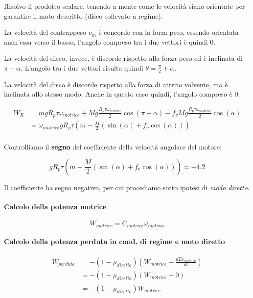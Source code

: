 \documentclass[main.tex]{subfiles}
\begin{document}
Risolvo il prodotto scalare, tenendo a mente come le velocità siano orientate per garantire il moto descritto (disco sollevato a regime).

La velocità del contrappeso $v_m$ è concorde con la forza peso, essendo orientata anch'essa verso il basso, l'angolo compreso tra i due vettori è quindi 0.

La velocità del disco, invece, è discorde rispetto alla forza peso ed è inclinata di $\pi - \alpha$. L'angolo tra i due vettori risulta quindi $\theta = \frac{\pi}{2}+\alpha$.

La velocità del disco è discorde rispetto alla forza di attrito volvente, ma è inclinata allo stesso modo. Anche in questo caso quindi, l'angolo compreso è 0.

\begin{align*}
  W_R &= mgR_p\tau\omega_{motrice} + Mg\frac{R_p\tau\omega_{motrice}}{2}\cos(\pi + \alpha) - f_vMg\frac{R_p\tau\omega_{motrice}}{2}\cos(\alpha)\\
  &= \omega_{motrice}gR_p\tau(m -\frac{M}{2}(\sin(\alpha) + f_v\cos(\alpha)))\\
\end{align*}

Controlliamo il \textbf{segno} del coefficiente della velocità angolare del motore:

\[
  gR_p\tau(m -\frac{M}{2}(\sin(\alpha) + f_v\cos(\alpha))) \approx -4.2
\]

Il coefficiente ha segno negativo, per cui procediamo sotto ipotesi di \textit{modo diretto}.

\paragraph{Calcolo della potenza motrice}

\[
  W_{motrice} = C_{motrice}\omega_{motrice}
\]

\paragraph{Calcolo della potenza perduta in cond. di regime e moto diretto}

\begin{align*}
  W_{perduta} &= -(1 - \mu_{diretto})(W_{motrice} - \frac{dEc_{motrice}}{dt}) \\
             &= -(1 - \mu_{diretto})(W_{motrice} - 0) \\
             &= -(1 - \mu_{diretto})W_{motrice}
\end{align*}
\end{document}
